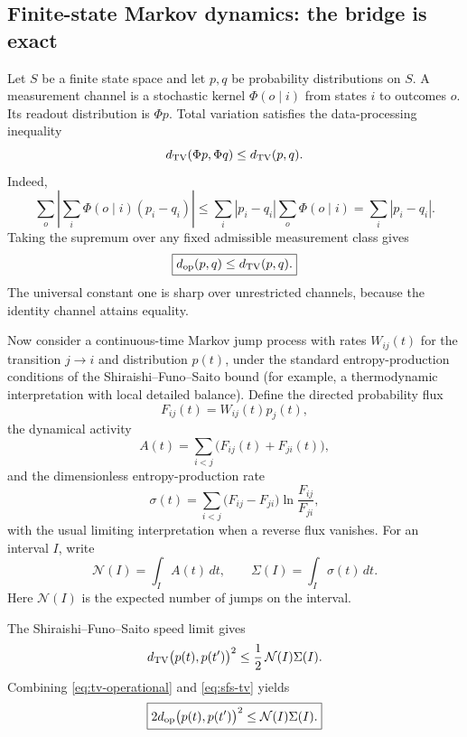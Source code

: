 \documentclass[11pt,a4paper]{article}
\theoremstyle{definition}
\numberwithin{equation}{section}
\begin{document}
\subsection*{Finite-state Markov dynamics: the bridge is exact}

Let $S$ be a finite state space and let $p,q$ be probability
distributions on $S$. A measurement channel is a stochastic kernel
$\Phi(o\mid i)$ from states $i$ to outcomes $o$. Its readout distribution
is $\Phi p$. Total variation satisfies the data-processing inequality
\begin{equation}
d_{\rm TV}(\Phi p,\Phi q)\le d_{\rm TV}(p,q).
\label{eq:tv-data-processing}
\end{equation}
Indeed,
\[
\sum_o\left|\sum_i\Phi(o\mid i)(p_i-q_i)\right|
\le
\sum_i|p_i-q_i|\sum_o\Phi(o\mid i)
=
\sum_i|p_i-q_i|.
\]
Taking the supremum over any fixed admissible measurement class gives
\begin{equation}
\boxed{
d_{\rm op}(p,q)\le d_{\rm TV}(p,q).
}
\label{eq:tv-operational}
\end{equation}
The universal constant one is sharp over unrestricted channels, because the
identity channel attains equality.

Now consider a continuous-time Markov jump process with rates
$W_{ij}(t)$ for the transition $j\to i$ and distribution $p(t)$, under the
standard entropy-production conditions of the Shiraishi--Funo--Saito bound
(for example, a thermodynamic interpretation with local detailed balance). Define the
directed probability flux
\[
F_{ij}(t)=W_{ij}(t)p_j(t),
\]
the dynamical activity
\[
A(t)=\sum_{i<j}\bigl(F_{ij}(t)+F_{ji}(t)\bigr),
\]
and the dimensionless entropy-production rate
\[
\sigma(t)
=
\sum_{i<j}
\bigl(F_{ij}-F_{ji}\bigr)
\ln\frac{F_{ij}}{F_{ji}},
\]
with the usual limiting interpretation when a reverse flux vanishes.
For an interval $I$, write
\[
\mathcal N(I)=\int_I A(t)\,dt,
\qquad
\Sigma(I)=\int_I\sigma(t)\,dt.
\]
Here $\mathcal N(I)$ is the expected number of jumps on the interval.

The Shiraishi--Funo--Saito speed limit gives
\begin{equation}
d_{\rm TV}\bigl(p(t),p(t')\bigr)^2
\le
\frac12\,\mathcal N(I)\Sigma(I).
\label{eq:sfs-tv}
\end{equation}
Combining \eqref{eq:tv-operational} and \eqref{eq:sfs-tv} yields
\begin{equation}
\boxed{
2d_{\rm op}\bigl(p(t),p(t')\bigr)^2
\le
\mathcal N(I)\Sigma(I).
}
\label{eq:operational-action}
\end{equation}
\end{document}
